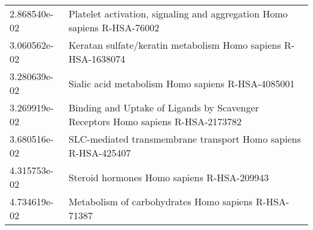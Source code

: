 \begin{longtable}{p{2.4cm}p{14.5cm}}
             2.868540e-02 &                               Platelet activation, signaling and aggregation Homo sapiens R-HSA-76002 \\
             3.060562e-02 &                                         Keratan sulfate/keratin metabolism Homo sapiens R-HSA-1638074 \\
             3.280639e-02 &                                                     Sialic acid metabolism Homo sapiens R-HSA-4085001 \\
             3.269919e-02 &                       Binding and Uptake of Ligands by Scavenger Receptors Homo sapiens R-HSA-2173782 \\
             3.680516e-02 &                                        SLC-mediated transmembrane transport Homo sapiens R-HSA-425407 \\
             4.315753e-02 &                                                            Steroid hormones Homo sapiens R-HSA-209943 \\
             4.734619e-02 &                                                  Metabolism of carbohydrates Homo sapiens R-HSA-71387 \\
\end{longtable}


